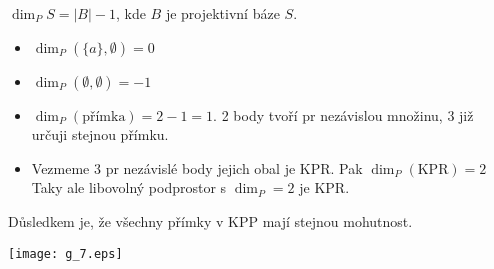 \begin{definition}[Dimenze]
    $\dim_P S=|B|-1$, kde $B$ je projektivní báze $S$.
\end{definition}

\begin{note}[O dimenzi]
    \begin{itemize}
        \item $\dim_P(\{a\},\emptyset)=0$
        \item $\dim_P(\emptyset, \emptyset)=-1$
        \item $\dim_P(\text{přímka})=2-1=1$.
		2 body tvoří pr nezávislou množinu, 3 již určuji stejnou přímku.
        \item Vezmeme 3 pr nezávislé body jejich obal je KPR. Pak $\dim_P(\text{KPR})=2$
		Taky ale libovolný podprostor s $\dim_P = 2$ je KPR.
    \end{itemize}

    Důsledkem je, že všechny přímky v KPP mají stejnou mohutnost.

    \texttt{[image: g\_7.eps]}
\end{note}

